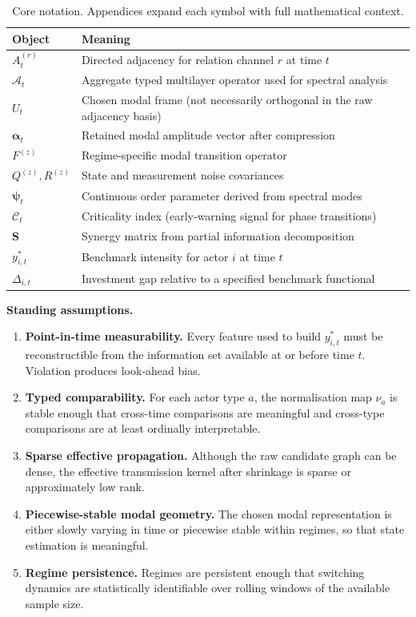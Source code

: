 \documentclass[11pt,a4paper]{article}
\theoremstyle{definition}
\newcommand{\balpha}{\bm{\alpha}}
\newcommand{\bpsi}{\bm{\psi}}
\begin{document}
\begin{table}[H]
\centering\small
\begin{tabularx}{\textwidth}{@{}>{\bfseries}p{2.7cm}X@{}}
\toprule
Object & Meaning \\
\midrule
$A_t^{(r)}$ & Directed adjacency for relation channel $r$ at time $t$ \\
$\mathcal{A}_t$ & Aggregate typed multilayer operator used for spectral analysis \\
$U_t$ & Chosen modal frame (not necessarily orthogonal in the raw adjacency basis) \\
$\balpha_t$ & Retained modal amplitude vector after compression \\
$F^{(z)}$ & Regime-specific modal transition operator \\
$Q^{(z)}, R^{(z)}$ & State and measurement noise covariances \\
$\bpsi_t$ & Continuous order parameter derived from spectral modes \\
$\mathcal{C}_t$ & Criticality index (early-warning signal for phase transitions) \\
$\mathbf{S}$ & Synergy matrix from partial information decomposition \\
$y^*_{i,t}$ & Benchmark intensity for actor $i$ at time $t$ \\
$\Delta_{i,t}$ & Investment gap relative to a specified benchmark functional \\
\bottomrule
\end{tabularx}
\caption{Core notation. Appendices expand each symbol with full mathematical context.}
\label{tab:notation_main}
\end{table}

\textbf{Standing assumptions.}
\begin{enumerate}[label=\textbf{A\arabic*:},leftmargin=2.2em]
  \item \textbf{Point-in-time measurability.} Every feature used to build $y^*_{i,t}$ must be reconstructible from the information set available at or before time $t$. Violation produces look-ahead bias.
  \item \textbf{Typed comparability.} For each actor type $a$, the normalisation map $\nu_a$ is stable enough that cross-time comparisons are meaningful and cross-type comparisons are at least ordinally interpretable.
  \item \textbf{Sparse effective propagation.} Although the raw candidate graph can be dense, the effective transmission kernel after shrinkage is sparse or approximately low rank.
  \item \textbf{Piecewise-stable modal geometry.} The chosen modal representation is either slowly varying in time or piecewise stable within regimes, so that state estimation is meaningful.
  \item \textbf{Regime persistence.} Regimes are persistent enough that switching dynamics are statistically identifiable over rolling windows of the available sample size.
\end{enumerate}
\end{document}
